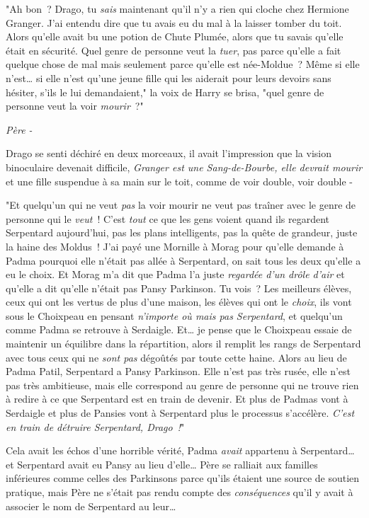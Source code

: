 "Ah bon~? Drago, tu \emph{sais} maintenant qu'il n'y a rien qui cloche chez Hermione Granger. J'ai entendu dire que tu avais eu du mal à la laisser tomber du toit. Alors qu'elle avait bu une potion de Chute Plumée, alors que tu savais qu'elle était en sécurité. Quel genre de personne veut la \emph{tuer}, pas parce qu'elle a fait quelque chose de mal mais seulement parce qu'elle est née-Moldue~? Même si elle n'est… si elle n'est qu'une jeune fille qui les aiderait pour leurs devoirs sans hésiter, s'ils le lui demandaient," la voix de Harry se brisa, "quel genre de personne veut la voir \emph{mourir}~?"

\emph{Père -}

Drago se senti déchiré en deux morceaux, il avait l'impression que la vision binoculaire devenait difficile, \emph{Granger est une Sang-de-Bourbe, elle devrait mourir} et une fille suspendue à sa main sur le toit, comme de voir double, voir double -

"Et quelqu'un qui ne veut \emph{pas} la voir mourir ne veut pas traîner avec le genre de personne qui le \emph{veut}~! C'est \emph{tout} ce que les gens voient quand ils regardent Serpentard aujourd'hui, pas les plans intelligents, pas la quête de grandeur, juste la haine des Moldus~! J'ai payé une Mornille à Morag pour qu'elle demande à Padma pourquoi elle n'était pas allée à Serpentard, on sait tous les deux qu'elle a eu le choix. Et Morag m'a dit que Padma l'a juste \emph{regardée d'un drôle d'air} et qu'elle a dit qu'elle n'était pas Pansy Parkinson. Tu vois~? Les meilleurs élèves, ceux qui ont les vertus de plus d'une maison, les élèves qui ont le \emph{choix}, ils vont sous le Choixpeau en pensant \emph{n'importe où mais pas Serpentard}, et quelqu'un comme Padma se retrouve à Serdaigle. Et… je pense que le Choixpeau essaie de maintenir un équilibre dans la répartition, alors il remplit les rangs de Serpentard avec tous ceux qui ne \emph{sont pas} dégoûtés par toute cette haine. Alors au lieu de Padma Patil, Serpentard a Pansy Parkinson. Elle n'est pas très rusée, elle n'est pas très ambitieuse, mais elle correspond au genre de personne qui ne trouve rien à redire à ce que Serpentard est en train de devenir. Et plus de Padmas vont à Serdaigle et plus de Pansies vont à Serpentard plus le processus s'accélère. \emph{C'est en train de détruire Serpentard, Drago~!}"

Cela avait les échos d'une horrible vérité, Padma \emph{avait} appartenu à Serpentard… et Serpentard avait eu Pansy au lieu d'elle… Père se ralliait aux familles inférieures comme celles des Parkinsons parce qu'ils étaient une source de soutien pratique, mais Père ne s'était pas rendu compte des \emph{conséquences} qu'il y avait à associer le nom de Serpentard au leur…


